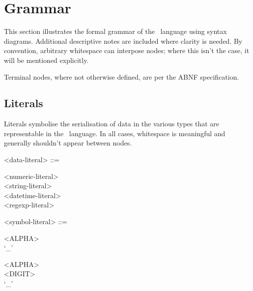 % 
% 
% 
% 
% 

\section{Grammar}

This section illustrates the formal grammar of the \stag\ language using
syntax diagrams. Additional descriptive notes are included where clarity
is needed. By convention, arbitrary whitespace can interpose nodes;
where this isn't the case, it will be mentioned explicitly.

Terminal nodes, where not otherwise defined, are per the ABNF
specification\cite{RFC5234}.

\subsection{Literals}

Literals symbolise the serialisation of data in the various types that
are representable in the \stag\ language. In all cases, whitespace is
meaningful and generally shouldn't appear between nodes.

\begin{grammar}
  <data-literal> ::= \begin{syntdiag}
    \begin{stack}
      <numeric-literal> \\
      <string-literal> \\
      <datetime-literal> \\
      <regexp-literal>
    \end{stack}
  \end{syntdiag}

  <symbol-literal> ::= \begin{syntdiag}
    \begin{stack}
      <ALPHA> \\
      `_'
    \end{stack}
    \begin{rep}
      \begin{stack}
        <ALPHA> \\
        <DIGIT> \\
        `_'
      \end{stack}
    \end{rep}
  \end{syntdiag}
\end{grammar}


